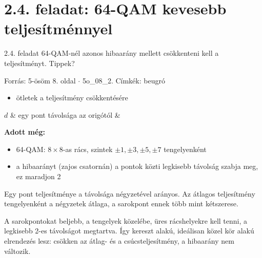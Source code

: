 \section{\texorpdfstring{2.4. feladat: 64-QAM kevesebb teljesítménnyel}{2.4. feladat: 64-QAM kevesebb teljesítménnyel}}\label{o2_04}
\setcounter{lepes}{0}
\begin{feladat}{2.4. feladat}
64-QAM-nél azonos hibaarány mellett csökkenteni kell a teljesítményt. Tippek?

{\footnotesize\sffamily Forrás: 5-ösöm 8. oldal $\cdot$ 5o\_08\_2. Címkék: beugró}
\end{feladat}
\begin{keresunk}
\begin{itemize}
\item ötletek a teljesítmény csökkentésére
\end{itemize}
\end{keresunk}
\begin{jeloles}
\begin{jeltabla}
$d$ & egy pont távolsága az origótól & \\
\end{jeltabla}
\par\smallskip\textbf{Adott még:}
\begin{itemize}
\item 64-QAM: $8\times8$-as rács, szintek $\pm1,\pm3,\pm5,\pm7$ tengelyenként
\item a hibaarányt (zajos csatornán) a pontok közti legkisebb távolság szabja meg, ez maradjon 2
\end{itemize}
\end{jeloles}

Egy pont teljesítménye a távolsága négyzetével arányos. Az átlagos teljesítmény tengelyenként a négyzetek átlaga, a sarokpont ennek több mint kétszerese.

\begin{center}\end{center}

\begin{center}\end{center}

A sarokpontokat beljebb, a tengelyek közelébe, üres rácshelyekre kell tenni, a legkisebb 2-es távolságot megtartva. Így kereszt alakú, ideálisan közel kör alakú elrendezés lesz: csökken az átlag- és a csúcsteljesítmény, a hibaarány nem változik.


